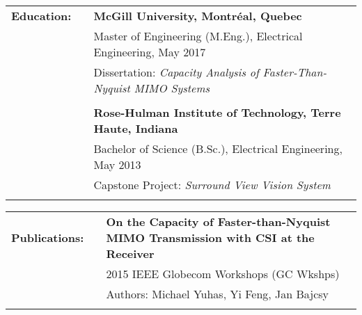 \documentclass{minimal}
\begin{document}
\begin{tabular}{ p{1.5cm} p{1cm} p{16cm} }
\textbf{Education:} & & \textbf{McGill University, Montréal, Quebec} \\
& & Master of Engineering (M.Eng.), Electrical Engineering, May 2017\\
& & Dissertation: \textit{Capacity Analysis of Faster-Than-Nyquist MIMO Systems}\\
& & \\
& & \textbf{Rose-Hulman Institute of Technology, Terre Haute, Indiana} \\
& & Bachelor of Science (B.Sc.), Electrical Engineering, May 2013\\
& & Capstone Project: \textit{Surround View Vision System}\\
& & \\
\end{tabular}

\begin{tabular}{ p{1.5cm} p{1cm} p{16cm} }
\textbf{Publications:} & & \textbf{On the Capacity of Faster-than-Nyquist MIMO Transmission with CSI at the Receiver}\\
& & 2015 IEEE Globecom Workshops (GC Wkshps)\\
& & Authors: Michael Yuhas, Yi Feng, Jan Bajcsy\\
& & \\
\end{tabular}
\end{document}
